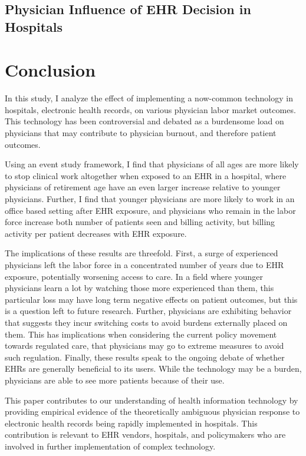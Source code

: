 \documentclass[11pt]{article}
\begin{document}
\subsection{Physician Influence of EHR Decision in Hospitals}


\section{Conclusion}

In this study, I analyze the effect of implementing a now-common technology in hospitals, electronic health records, on various physician labor market outcomes. This technology has been controversial and debated as a burdensome load on physicians that may contribute to physician burnout, and therefore patient outcomes. 

Using an event study framework, I find that physicians of all ages are more likely to stop clinical work altogether when exposed to an EHR in a hospital, where physicians of retirement age have an even larger increase relative to younger physicians. Further, I find that younger physicians are more likely to work in an office based setting after EHR exposure, and physicians who remain in the labor force increase both number of patients seen and billing activity, but billing activity per patient decreases with EHR exposure. 

The implications of these results are threefold. First, a surge of experienced physicians left the labor force in a concentrated number of years due to EHR exposure, potentially worsening access to care. In a field where younger physicians learn a lot by watching those more experienced than them, this particular loss may have long term negative effects on patient outcomes, but this is a question left to future research. Further, physicians are exhibiting behavior that suggests they incur switching costs to avoid burdens externally placed on them. This has implications when considering the current policy movement towards regulated care, that physicians may go to extreme measures to avoid such regulation. Finally, these results speak to the ongoing debate of whether EHRs are generally beneficial to its users. While the technology may be a burden, physicians are able to see more patients because of their use. 

This paper contributes to our understanding of health information technology by providing empirical evidence of the theoretically ambiguous physician response to electronic health records being rapidly implemented in hospitals. This contribution is relevant to EHR vendors, hospitals, and policymakers who are involved in further implementation of complex technology. 
\end{document}

